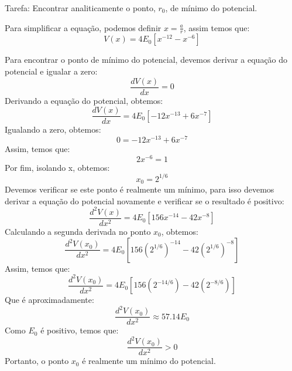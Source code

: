 \documentclass[12pt, a4paper]{article} %
\begin{document}
        Tarefa: Encontrar analiticamente o ponto, $r_{0}$, de m\'inimo do potencial.

        Para simplificar a equa\c{c}\~ao, podemos definir $x = \frac{a}{r}$, assim temos que:
        \begin{equation*}
            V(x) = 4E_{0} \left[ x^{-12} - x^{-6} \right]
        \end{equation*}

        Para encontrar o ponto de m\'inimo do potencial, devemos derivar a equa\c{c}\~ao do potencial e igualar a zero:
        \begin{equation*}
            \frac{dV(x)}{dx} = 0
        \end{equation*}
        Derivando a equa\c{c}\~ao do potencial, obtemos:
        \begin{equation*}
            \frac{dV(x)}{dx} = 4E_{0} \left[ -12{x}^{-13} + 6{x}^{-7} \right]
        \end{equation*}
        Igualando a zero, obtemos:
        \begin{equation*}
            0 = -12{x}^{-13} + 6{x}^{-7}
        \end{equation*}
        Assim, temos que:
        \begin{equation*}
            2{x}^{-6} = 1
        \end{equation*}
        Por fim, isolando x, obtemos:
        \begin{equation*}
            x_{0} = 2^{1/6}
        \end{equation*}
        Devemos verificar se este ponto \'e realmente um m\'inimo, para isso devemos derivar a equa\c{c}\~ao do potencial novamente e verificar se o resultado \'e positivo:
        \begin{equation*}
            \frac{d^{2}V(x)}{dx^{2}} = 4E_{0} \left[ 156{x}^{-14} - 42{x}^{-8} \right]
        \end{equation*}
        Calculando a segunda derivada no ponto $x_{0}$, obtemos:
        \begin{equation*}
            \frac{d^{2}V(x_{0})}{dx^{2}} = 4E_{0} \left[ 156(2^{1/6})^{-14} - 42(2^{1/6})^{-8} \right]
        \end{equation*}
        Assim, temos que:
        \begin{equation*}
            \frac{d^{2}V(x_{0})}{dx^{2}} = 4E_{0} \left[ 156(2^{-14/6}) - 42(2^{-8/6}) \right]
        \end{equation*}
        Que \'e aproximadamente:
        \begin{equation*}
            \frac{d^{2}V(x_{0})}{dx^{2}} \approx 57.14E_{0}
        \end{equation*}
        Como $E_{0}$ \'e positivo, temos que:
        \begin{equation*}
            \frac{d^{2}V(x_{0})}{dx^{2}} > 0
        \end{equation*}
        Portanto, o ponto $x_{0}$ \'e realmente um m\'inimo do potencial.
\end{document}
